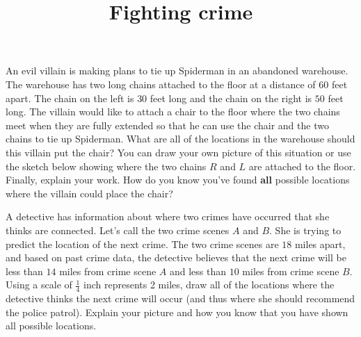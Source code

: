 \documentclass[noauthor,nooutcomes]{ximera}
\title{Fighting crime}
\begin{document}
\begin{abstract}
\end{abstract}
\maketitle

\begin{problem}

An evil villain is making plans to tie up Spiderman in an abandoned warehouse. The warehouse has two long chains attached to the floor at a distance of $60$ feet apart. The chain on the left is $30$ feet long and the chain on the right is $50$ feet long. The villain would like to attach a chair to the floor where the two chains meet when they are fully extended so that he can use the chair and the two chains to tie up Spiderman. What are all of the locations in the warehouse should this villain put the chair? You can draw your own picture of this situation or use the sketch below showing where the two chains $R$ and $L$ are attached to the floor.  Finally, explain your work. How do you know you've found {\bf all} possible locations where the villain could place the chair?

\vfill
\begin{image}
\end{image}
\vfill


\end{problem}

\newpage

\begin{problem}
A detective has information about where two crimes have occurred that she thinks are connected. Let's call the two crime scenes $A$ and $B$. She is trying to predict the location of the next crime. The two crime scenes are $18$ miles apart, and based on past crime data, the detective believes that the next crime will be less than $14$ miles from crime scene $A$ and less than $10$ miles from crime scene $B$.  Using a scale of $\frac{1}{4}$ inch represents 2 miles, draw all of the locations where the detective thinks the next crime will occur (and thus where she should recommend the police patrol).  Explain your picture and how you know that you have shown all possible locations.


\end{problem}
\end{document}
